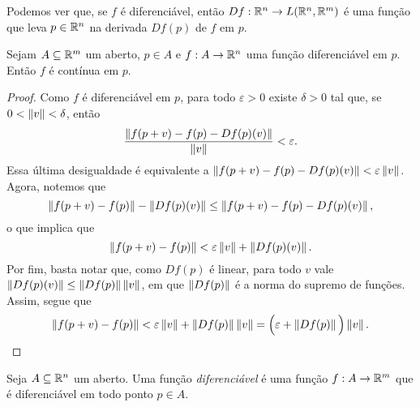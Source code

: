 Podemos ver que, se $f$ é diferenciável, então $Df: \mathbb{R}^n \to L(\mathbb{R}^n,\mathbb{R}^m)$ é uma função que leva $p \in \mathbb{R}^n$ na derivada $Df(p)$ de $f$ em $p$.

\begin{prop}
	Sejam $A \subseteq \mathbb{R}^m$ um aberto, $p \in A$ e $f: A \to \mathbb{R}^n$ uma função diferenciável em $p$. Então $f$ é contínua em $p$.
\end{prop}
\begin{proof}
	Como $f$ é diferenciável em $p$, para todo $\varepsilon > 0$ existe $\delta > 0$ tal que, se $0<\left\Vert{v}\right\Vert< \delta$, então
	\begin{equation*}
	\frac{\left\Vert{f(p+v) - f(p) - Df(p)(v)}\right\Vert}{\left\Vert{v}\right\Vert} < \varepsilon.
	\end{equation*}
Essa última desigualdade é equivalente a $\left\Vert{f(p+v) - f(p) - Df(p)(v)}\right\Vert<\varepsilon\left\Vert{v}\right\Vert$. Agora, notemos que
	\begin{equation*}
	\left\Vert{f(p+v)-f(p)}\right\Vert - \left\Vert{Df(p)(v)}\right\Vert \leq \left\Vert{f(p+v) - f(p) - Df(p)(v)}\right\Vert,
	\end{equation*}
o que implica que
	\begin{equation*}
	\left\Vert{f(p+v)-f(p)}\right\Vert < \varepsilon\left\Vert{v}\right\Vert + \left\Vert{Df(p)(v)}\right\Vert.
	\end{equation*}
	Por fim, basta notar que, como $Df(p)$ é linear, para todo $v$ vale $\left\Vert{Df(p)(v)}\right\Vert \leq \left\Vert{Df(p)}\right\Vert\left\Vert{v}\right\Vert$, em que $\left\Vert{Df(p)}\right\Vert$ é a norma do supremo de funções. Assim, segue que
	\begin{equation*}
	\left\Vert{f(p+v)-f(p)}\right\Vert < \varepsilon\left\Vert{v}\right\Vert + \left\Vert{Df(p)}\right\Vert\left\Vert{v}\right\Vert = \Big(\varepsilon+\left\Vert{Df(p)}\right\Vert\Big) \left\Vert{v}\right\Vert.
	\end{equation*}
\end{proof}

\begin{defi}
	Seja $A \subseteq \mathbb{R}^n$ um aberto. Uma função \emph{diferenciável} é  uma função $f: A \to \mathbb{R}^m$ que é diferenciável em todo ponto $p \in A$.
\end{defi}

